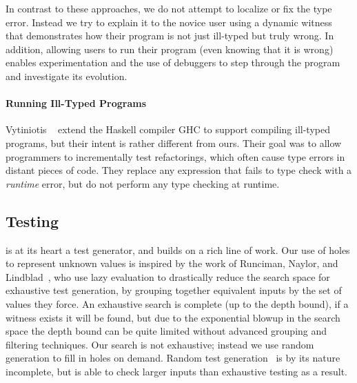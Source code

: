 In contrast to these approaches, we do not attempt to localize or fix
the type error. Instead we try to explain it to the novice user using a
dynamic witness that demonstrates how their program is not just
ill-typed but truly wrong. In addition, allowing users to run their
program (even knowing that it is wrong) enables experimentation and the
use of debuggers to step through the program and investigate its
evolution.

\paragraph{Running Ill-Typed Programs}
\label{sec:running-ill-typed}
Vytiniotis \etal~\cite{vytiniotis_equality_2012} extend the Haskell
compiler GHC to support compiling ill-typed programs, but their intent
is rather different from ours. Their goal was to allow programmers to
incrementally test refactorings, which often cause type errors in
distant pieces of code. They replace any expression that fails to type
check with a \emph{runtime} error, but do not perform any type checking
at runtime.

\subsection{Testing}
\label{sec:testing}
\nanomaly is at its heart a test generator, and builds on a rich line of
work.
%
Our use of holes to represent unknown values is inspired by the work of
Runciman, Naylor, and Lindblad~\cite{runciman_smallcheck_2008,naylor_finding_2007,lindblad_property_2007},
%
who use lazy evaluation to drastically reduce the search space for
exhaustive test generation, by grouping together equivalent inputs by
the set of values they force. An exhaustive search is complete (up to
the depth bound), if a witness exists it will be found, but due to the
exponential blowup in the search space the depth bound can be quite
limited without advanced grouping and filtering techniques.
%
Our search is not exhaustive; instead we use random generation to fill
in holes on demand.
%
Random test generation~\cite{claessen_quickcheck:_2000,csallner_jcrasher:_2004,pacheco_feedback-directed_2007}
%
is by its nature incomplete, but is able to check larger inputs than
exhaustive testing as a result.

